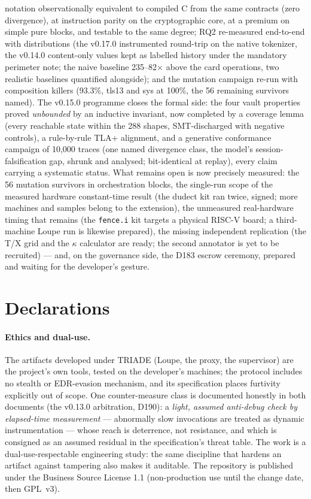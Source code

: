 \documentclass[11pt,a4paper]{article}
\newcommand{\code}[1]{\texttt{\small #1}}
\begin{document}
notation observationally equivalent to compiled C from the same contracts
(zero divergence), at instruction parity on the cryptographic core, at a
premium on simple pure blocks, and testable to the same degree; RQ2
re-measured end-to-end with distributions (the v0.17.0 instrumented
round-trip on the native tokenizer, the v0.14.0 content-only values
kept as labelled history under the mandatory perimeter note; the naive
baseline 235--82$\times$ above the card operations, two realistic
baselines quantified alongside); and the mutation campaign re-run with
composition killers (93.3\%, tls13 and sys at 100\%, the 56 remaining
survivors named). The v0.15.0 programme closes the formal side: the four vault
properties proved \emph{unbounded} by an inductive invariant, now
completed by a coverage lemma (every reachable state within the 288
shapes, SMT-discharged with negative controls), a rule-by-rule TLA+
alignment, and a generative conformance campaign of 10{,}000 traces
(one named divergence class, the model's session-falsification gap,
shrunk and analysed; bit-identical at replay), every claim carrying a
systematic status. What remains open
is now precisely measured: the 56 mutation survivors in orchestration
blocks, the single-run scope of the measured hardware constant-time
result (the dudect kit ran twice, signed; more machines and samples
belong to the extension), the unmeasured real-hardware
timing that remains (the \code{fence.i} kit targets a physical RISC-V
board; a third-machine Loupe run is likewise prepared), the missing
independent replication
(the T/X grid and the $\kappa$ calculator are ready; the second
annotator is yet to be recruited) --- and, on the
governance side, the D183 escrow ceremony, prepared and waiting for the
developer's gesture.

\section*{Declarations}

\paragraph{Ethics and dual-use.} The artifacts developed under TRIADE
(Loupe, the proxy, the supervisor) are the project's own tools, tested on
the developer's machines; the protocol includes no stealth or
EDR-evasion mechanism, and its specification places furtivity explicitly
out of scope. One counter-measure class is documented honestly in both
documents (the v0.13.0 arbitration, D190): a \emph{light, assumed
anti-debug check by elapsed-time measurement} --- abnormally slow
invocations are treated as dynamic instrumentation --- whose reach is
deterrence, not resistance, and which is consigned as an assumed residual
in the specification's threat table. The work is a dual-use-respectable
engineering study: the same discipline that hardens an artifact against
tampering also makes it auditable. The repository is published under the
Business Source License 1.1 (non-production use until the change date,
then GPL~v3).
\end{document}
